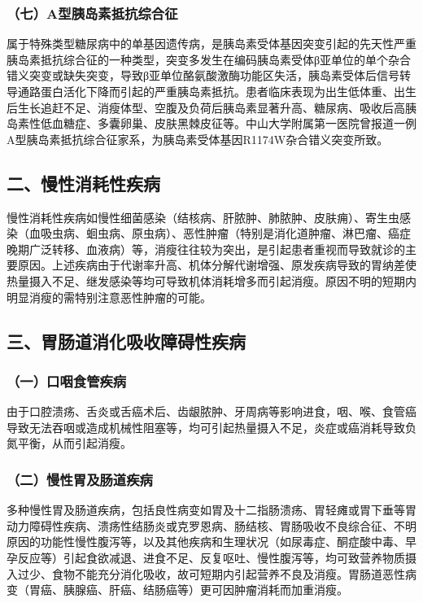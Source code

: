 \subsubsection{（七）A型胰岛素抵抗综合征}

属于特殊类型糖尿病中的单基因遗传病，是胰岛素受体基因突变引起的先天性严重胰岛素抵抗综合征的一种类型，突变多发生在编码胰岛素受体β亚单位的单个杂合错义突变或缺失突变，导致β亚单位酪氨酸激酶功能区失活，胰岛素受体后信号转导通路蛋白活化下降而引起的严重胰岛素抵抗。患者临床表现为出生低体重、出生后生长追赶不足、消瘦体型、空腹及负荷后胰岛素显著升高、糖尿病、吸收后高胰岛素性低血糖症、多囊卵巢、皮肤黑棘皮征等。中山大学附属第一医院曾报道一例A型胰岛素抵抗综合征家系，为胰岛素受体基因R1174W杂合错义突变所致。

\subsection{二、慢性消耗性疾病}

慢性消耗性疾病如慢性细菌感染（结核病、肝脓肿、肺脓肿、皮肤痈）、寄生虫感染（血吸虫病、蛔虫病、原虫病）、恶性肿瘤（特别是消化道肿瘤、淋巴瘤、癌症晚期广泛转移、血液病）等，消瘦往往较为突出，是引起患者重视而导致就诊的主要原因。上述疾病由于代谢率升高、机体分解代谢增强、原发疾病导致的胃纳差使热量摄入不足、继发感染等均可导致机体消耗增多而引起消瘦。原因不明的短期内明显消瘦的需特别注意恶性肿瘤的可能。

\subsection{三、胃肠道消化吸收障碍性疾病}

\subsubsection{（一）口咽食管疾病}

由于口腔溃疡、舌炎或舌癌术后、齿龈脓肿、牙周病等影响进食，咽、喉、食管癌导致无法吞咽或造成机械性阻塞等，均可引起热量摄入不足，炎症或癌消耗导致负氮平衡，从而引起消瘦。

\subsubsection{（二）慢性胃及肠道疾病}

多种慢性胃及肠道疾病，包括良性病变如胃及十二指肠溃疡、胃轻瘫或胃下垂等胃动力障碍性疾病、溃疡性结肠炎或克罗恩病、肠结核、胃肠吸收不良综合征、不明原因的功能性慢性腹泻等，以及其他疾病和生理状况（如尿毒症、酮症酸中毒、早孕反应等）引起食欲减退、进食不足、反复呕吐、慢性腹泻等，均可致营养物质摄入过少、食物不能充分消化吸收，故可短期内引起营养不良及消瘦。胃肠道恶性病变（胃癌、胰腺癌、肝癌、结肠癌等）更可因肿瘤消耗而加重消瘦。

